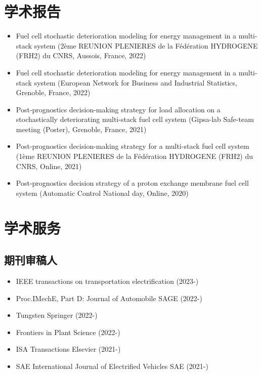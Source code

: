 \documentclass{resume}
\begin{document}
\section{学术报告}
\begin{itemize}[parsep=0.2ex]
  \item Fuel cell stochastic deterioration modeling for energy management in a multi-stack system (2ème REUNION PLENIERES de la Fédération HYDROGENE (FRH2) du CNRS, Aussois, France, 2022)
  \item Fuel cell stochastic deterioration modeling for energy management in a multi-stack system (European Network for Business and Industrial Statistics, Grenoble, France, 2022)
  \item Post-prognostics decision-making strategy for load allocation on a stochastically deteriorating multi-stack fuel cell system (Gipsa-lab Safe-team meeting (Poster), Grenoble, France, 2021)
  \item Post-prognostics decision-making strategy for a multi-stack fuel cell system (1ème REUNION PLENIERES de la Fédération HYDROGENE (FRH2) du CNRS, Online, 2021)
  \item Post-prognostics decision strategy of a proton exchange membrane fuel cell system (Automatic Control National day, Online, 2020)
\end{itemize}

\section{学术服务}
\subsection{期刊审稿人}
\begin{itemize}
    \item IEEE transactions on transportation electrification (2023-)
    \item Proc.IMechE, Part D: Journal of Automobile SAGE (2022-)
    \item Tungsten Springer (2022-)
    \item Frontiers in Plant Science (2022-)
    \item ISA Transactions Elsevier (2021-)
    \item SAE International Journal of Electrified Vehicles SAE (2021-)
\end{itemize}

%
%
\end{document}
